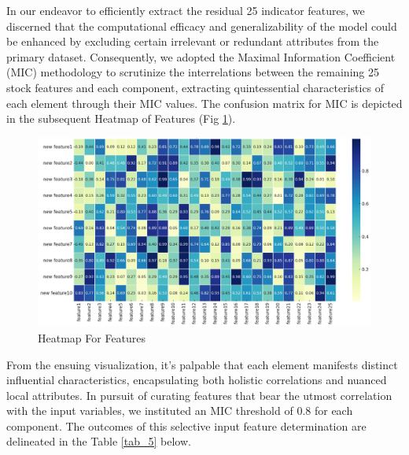 \documentclass[sn-mathphys,Numbered]{sn-jnl}
\theoremstyle{thmstyleone}%
\theoremstyle{thmstyletwo}%
\theoremstyle{thmstylethree}%
\begin{document}
In our endeavor to efficiently extract the residual 25 indicator features, we discerned that the computational efficacy and generalizability of the model could be enhanced by excluding certain irrelevant or redundant attributes from the primary dataset. Consequently, we adopted the Maximal Information Coefficient (MIC) methodology to scrutinize the interrelations between the remaining 25 stock features and each component, extracting quintessential characteristics of each element through their MIC values. The confusion matrix for MIC is depicted in the subsequent Heatmap of Features (Fig \ref{Heat Map}).
\begin{figure}[h]
    \centering
    \includegraphics[width=1\textwidth]{pngs/Heat Map.png}
    \caption{ Heatmap For Features}
    \label{Heat Map}
\end{figure}

From the ensuing visualization, it's palpable that each element manifests distinct influential characteristics, encapsulating both holistic correlations and nuanced local attributes. In pursuit of curating features that bear the utmost correlation with the input variables, we instituted an MIC threshold of 0.8 for each component. The outcomes of this selective input feature determination are delineated in the Table \ref{tab_5} below.
\end{document}
